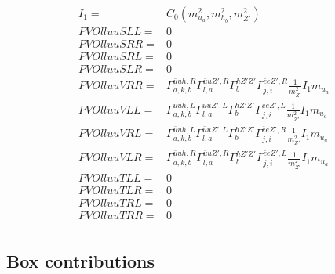 \documentclass[A4,landscape]{article}
\begin{document}
\begin{align} 
I_1= & C_0(m^2_{u_{{a}}}, m^2_{h_{{b}}}, m^2_{{Z'}}) \\ 
  PVOlluuSLL= & 0 \\ 
  PVOlluuSRR= & 0 \\ 
  PVOlluuSRL= & 0 \\ 
  PVOlluuSLR= & 0 \\ 
  PVOlluuVRR= &  \Gamma^{\bar{u}u h ,R}_{a, k, b} \Gamma^{\bar{u}u {Z'} ,R}_{l, a} \Gamma^{h {Z'} {Z'} }_{b} \Gamma^{\bar{e}e {Z'} ,R}_{j, i} \frac{1}{m^2_{{Z'}}} I_1 m_{u_{{a}}} \\ 
  PVOlluuVLL= &  \Gamma^{\bar{u}u h ,L}_{a, k, b} \Gamma^{\bar{u}u {Z'} ,L}_{l, a} \Gamma^{h {Z'} {Z'} }_{b} \Gamma^{\bar{e}e {Z'} ,L}_{j, i} \frac{1}{m^2_{{Z'}}} I_1 m_{u_{{a}}} \\ 
  PVOlluuVRL= &  \Gamma^{\bar{u}u h ,L}_{a, k, b} \Gamma^{\bar{u}u {Z'} ,L}_{l, a} \Gamma^{h {Z'} {Z'} }_{b} \Gamma^{\bar{e}e {Z'} ,R}_{j, i} \frac{1}{m^2_{{Z'}}} I_1 m_{u_{{a}}} \\ 
  PVOlluuVLR= &  \Gamma^{\bar{u}u h ,R}_{a, k, b} \Gamma^{\bar{u}u {Z'} ,R}_{l, a} \Gamma^{h {Z'} {Z'} }_{b} \Gamma^{\bar{e}e {Z'} ,L}_{j, i} \frac{1}{m^2_{{Z'}}} I_1 m_{u_{{a}}} \\ 
  PVOlluuTLL= & 0 \\ 
  PVOlluuTLR= & 0 \\ 
  PVOlluuTRL= & 0 \\ 
  PVOlluuTRR= & 0 \\ 
\end{align} 
\subsection{Box contributions} 
\end{document}
